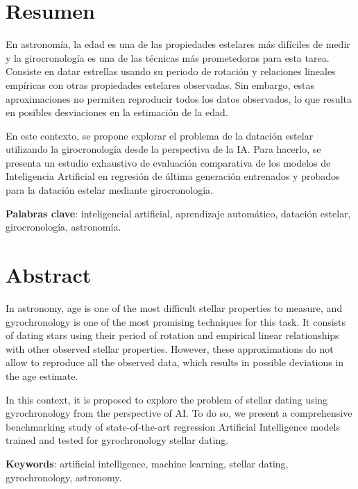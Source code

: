 \chapter{Resumen}

\vspace{0.5cm}

En astronomía, la edad es una de las propiedades estelares más difíciles de medir y la girocronología es una de las técnicas más prometedoras para esta tarea. Consiste en datar estrellas usando su periodo de rotación y relaciones lineales empíricas con otras propiedades estelares observadas. Sin embargo, estas aproximaciones no permiten reproducir todos los datos observados, lo que resulta en posibles desviaciones en la estimación de la edad.

En este contexto, se propone explorar el problema de la datación estelar utilizando la girocronología desde la perspectiva de la IA. Para hacerlo, se presenta un estudio exhaustivo de evaluación comparativa de los modelos de Inteligencia Artificial en regresión de última generación entrenados y probados para la datación estelar mediante girocronología.

\vspace{1cm}

\textbf{Palabras clave}: inteligencial artificial, aprendizaje automático, datación estelar, girocronología, astronomía.


\newpage
\thispagestyle{empty}
\hspace*{0.5cm}
\newpage

\chapter{Abstract}

\vspace{0.5cm}


In astronomy, age is one of the most difficult stellar properties to measure, and gyrochronology is one of the most promising techniques for this task. It consists of dating stars using their period of rotation and empirical linear relationships with other observed stellar properties. However, these approximations do not allow to reproduce all the observed data, which results in possible deviations in the age estimate.

In this context, it is proposed to explore the problem of stellar dating using gyrochronology from the perspective of AI. To do so, we present a comprehensive benchmarking study of state-of-the-art regression Artificial Intelligence models trained and tested for gyrochronology stellar dating. 

\vspace{1cm}

\textbf{Keywords}: artificial intelligence, machine learning, stellar dating, gyrochronology, astronomy.


\newpage
\thispagestyle{empty}
\hspace*{0.5cm}
\newpage